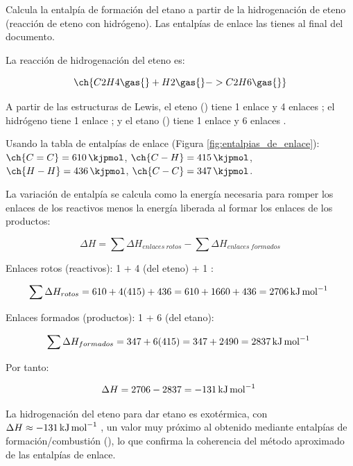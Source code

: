 \begin{exercise}
    Calcula la entalpía de formación del etano a partir de la hidrogenación de eteno (reacción de eteno con hidrógeno). Las entalpías de enlace las tienes al final del documento.

    \begin{solu}

        La reacción de hidrogenación del eteno es:

        \begin{equation*}
            \ch{C2H4 \gas{} + H2 \gas{} -> C2H6 \gas{}}
        \end{equation*}

        A partir de las estructuras de Lewis, el eteno () tiene 1 enlace  y 4 enlaces ; el hidrógeno tiene 1 enlace ; y el etano () tiene 1 enlace  y 6 enlaces .

        Usando la tabla de entalpías de enlace (Figura \ref{fig:entalpias_de_enlace}): \(\ch{C=C} = \SI{610}{\kjpmol}\), \(\ch{C-H} = \SI{415}{\kjpmol}\), \(\ch{H-H} = \SI{436}{\kjpmol}\), \(\ch{C-C} = \SI{347}{\kjpmol}\).

        La variación de entalpía se calcula como la energía necesaria para romper los enlaces de los reactivos menos la energía liberada al formar los enlaces de los productos:

        \begin{equation*}
            \Delta H = \sum \Delta H_{enlaces \ rotos} - \sum \Delta H_{enlaces \ formados}
        \end{equation*}

        Enlaces rotos (reactivos): 1  + 4  (del eteno) + 1 :

        \begin{equation*}
            \sum \Delta H_{rotos} = 610 + 4(415) + 436 = 610 + 1660 + 436 = \energia[kjmol]{2706}
        \end{equation*}

        Enlaces formados (productos): 1  + 6  (del etano):

        \begin{equation*}
            \sum \Delta H_{formados} = 347 + 6(415) = 347 + 2490 = \energia[kjmol]{2837}
        \end{equation*}

        Por tanto:

        \begin{equation*}
            \Delta H = 2706 - 2837 = \energia[kjmol]{-131}
        \end{equation*}

        La hidrogenación del eteno para dar etano es exotérmica, con \(\Delta H \approx \energia[kjmol]{-131}\), un valor muy próximo al obtenido mediante entalpías de formación/combustión (), lo que confirma la coherencia del método aproximado de las entalpías de enlace.

    \end{solu}
\end{exercise}

